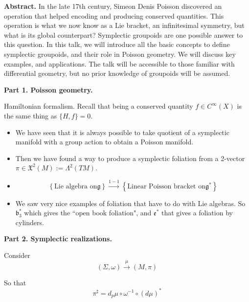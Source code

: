 \medskip\noindent
{\bf Abstract.}
In the late 17th century, Simeon Denis
Poisson discovered an operation that
helped encoding and producing conserved
quantities. This operation is what we
now know as a Lie bracket, an infinitesimal
symmetry, but what is its global
counterpart? Symplectic groupoids are one
possible answer to this question. In
this talk, we will introduce all the basic
concepts to define symplectic
groupoids, and their role in Poisson
geometry. We will discuss key examples, and
applications. The talk will be accessible to
those familiar with differential
geometry, but no prior knowledge of groupoids
will be assumed.


\medskip\noindent
{\bf Part 1. Poisson geometry.}

Hamiltonian formalism. Recall that being a
conserved quantity \(f \in
C^\infty(X)\) is the same thing as
\(\{H,f\}=0\).

\begin{itemize} \item We have seen that it is
always possible to take quotient
of a symplectic manifold with a group action
to obtain a  Poisson
manifold.  \item Then we have found a way to
produce a symplectic foliation
from a 2-vector \(\pi \in
\mathfrak{X}^2(M):=\Lambda^{2}(TM)\).  \item

\begin{remark}
\[\left\{ \text{Lie algebra on
\(\mathfrak{g}\)}
\right\} \xrightarrow{1-1}\left\{
\text{Linear Poisson bracket on
\(\mathfrak{g}^*\)}  \right\}  \]
\end{remark}

\item We saw very nice examples
of foliation that have to do with Lie
algebras. So \(\mathfrak{b}^*_3\) which
gives the ``open book foliation", and
\(\mathfrak{e}^*\) that gives a foliation
by cylinders.
\end{itemize}

\medskip\noindent
{\bf Part 2. Symplectic realizations.}

Consider
\[(\Sigma,\omega) \xrightarrow{\mu}(M,\pi)\]

So that
\[\pi ^\sharp=d_p\mu \circ \omega^{-1}
\circ(d\mu)^*\]



